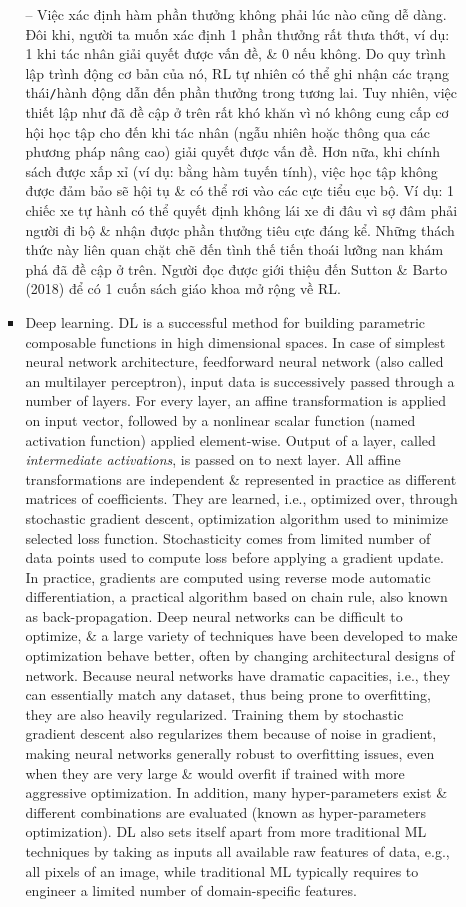 \documentclass{article}
\begin{document}
\begin{itemize}
\begin{itemize}
\begin{itemize}
            -- Việc xác định hàm phần thưởng không phải lúc nào cũng dễ dàng. Đôi khi, người ta muốn xác định 1 phần thưởng rất thưa thớt, ví dụ: 1 khi tác nhân giải quyết được vấn đề, \& 0 nếu không. Do quy trình lập trình động cơ bản của nó, RL tự nhiên có thể ghi nhận các trạng thái{\tt/}hành động dẫn đến phần thưởng trong tương lai. Tuy nhiên, việc thiết lập như đã đề cập ở trên rất khó khăn vì nó không cung cấp cơ hội học tập cho đến khi tác nhân (ngẫu nhiên hoặc thông qua các phương pháp nâng cao) giải quyết được vấn đề. Hơn nữa, khi chính sách được xấp xỉ (ví dụ: bằng hàm tuyến tính), việc học tập không được đảm bảo sẽ hội tụ \& có thể rơi vào các cực tiểu cục bộ. Ví dụ: 1 chiếc xe tự hành có thể quyết định không lái xe đi đâu vì sợ đâm phải người đi bộ \& nhận được phần thưởng tiêu cực đáng kể. Những thách thức này liên quan chặt chẽ đến tình thế tiến thoái lưỡng nan khám phá đã đề cập ở trên. Người đọc được giới thiệu đến Sutton \& Barto (2018) để có 1 cuốn sách giáo khoa mở rộng về RL.
            \item {\sf Deep learning.} DL is a successful method for building parametric composable functions in high dimensional spaces. In case of simplest neural network architecture, feedforward neural network (also called an multilayer perceptron), input data is successively passed through a number of layers. For every layer, an affine transformation is applied on input vector, followed by a nonlinear scalar function (named activation function) applied element-wise. Output of a layer, called {\it intermediate activations}, is passed on to next layer. All affine transformations are independent \& represented in practice as different matrices of coefficients. They are learned, i.e., optimized over, through stochastic gradient descent, optimization algorithm used to minimize selected loss function. Stochasticity comes from limited number of data points used to compute loss before applying a gradient update. In practice, gradients are computed using reverse mode automatic differentiation, a practical algorithm based on chain rule, also known as back-propagation. Deep neural networks can be difficult to optimize, \& a large variety of techniques have been developed to make optimization behave better, often by changing architectural designs of network. Because neural networks have dramatic capacities, i.e., they can essentially match any dataset, thus being prone to overfitting, they are also heavily regularized. Training them by stochastic gradient descent also regularizes them because of noise in gradient, making neural networks generally robust to overfitting issues, even when they are very large \& would overfit if trained with more aggressive optimization. In addition, many hyper-parameters exist \& different combinations are evaluated (known as hyper-parameters optimization). DL also sets itself apart from more traditional ML techniques by taking as inputs all available raw features of data, e.g., all pixels of an image, while traditional ML typically requires to engineer a limited number of domain-specific features.


\end{itemize}
\end{itemize}
\end{itemize}
\end{document}
